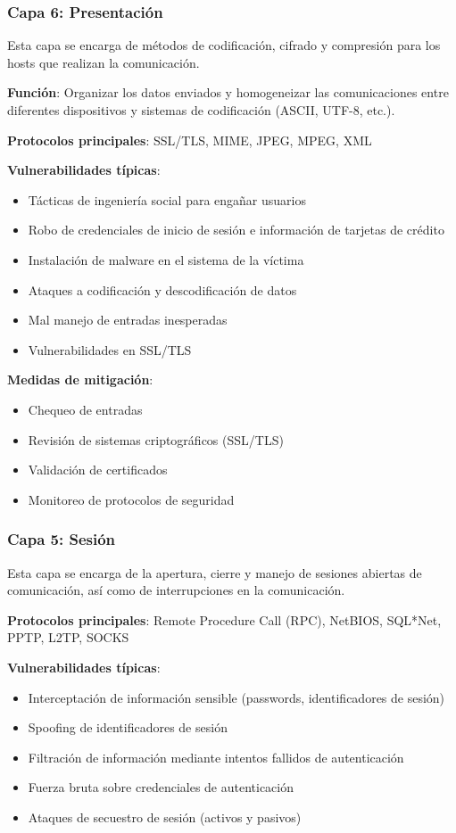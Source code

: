 \begin{itemize}
\subsubsection{Capa 6: Presentación}

Esta capa se encarga de métodos de codificación, cifrado y compresión para los hosts que realizan la comunicación.

\textbf{Función}: Organizar los datos enviados y homogeneizar las comunicaciones entre diferentes dispositivos y sistemas de codificación (ASCII, UTF-8, etc.).

\textbf{Protocolos principales}: SSL/TLS, MIME, JPEG, MPEG, XML

\textbf{Vulnerabilidades típicas}:
\begin{itemize}
    \item Tácticas de ingeniería social para engañar usuarios
    \item Robo de credenciales de inicio de sesión e información de tarjetas de crédito
    \item Instalación de malware en el sistema de la víctima
    \item Ataques a codificación y descodificación de datos
    \item Mal manejo de entradas inesperadas
    \item Vulnerabilidades en SSL/TLS
\end{itemize}

\textbf{Medidas de mitigación}:
\begin{itemize}
    \item Chequeo de entradas
    \item Revisión de sistemas criptográficos (SSL/TLS)
    \item Validación de certificados
    \item Monitoreo de protocolos de seguridad
\end{itemize}

\subsubsection{Capa 5: Sesión}

Esta capa se encarga de la apertura, cierre y manejo de sesiones abiertas de comunicación, así como de interrupciones en la comunicación.

\textbf{Protocolos principales}: Remote Procedure Call (RPC), NetBIOS, SQL*Net, PPTP, L2TP, SOCKS

\textbf{Vulnerabilidades típicas}:
\begin{itemize}
    \item Interceptación de información sensible (passwords, identificadores de sesión)
    \item Spoofing de identificadores de sesión
    \item Filtración de información mediante intentos fallidos de autenticación
    \item Fuerza bruta sobre credenciales de autenticación
    \item Ataques de secuestro de sesión (activos y pasivos)
\end{itemize}


\end{itemize}
